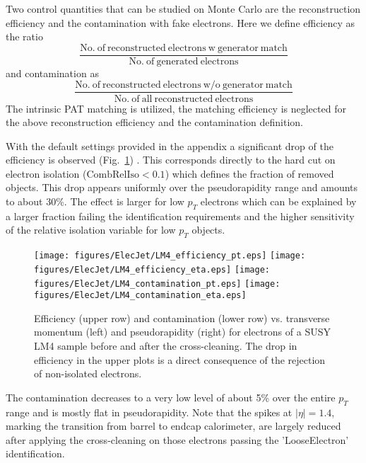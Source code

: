 \documentclass{cmspaper}
\begin{document}
Two control quantities that can be
studied on Monte Carlo are the reconstruction efficiency and the contamination
with fake electrons. Here we define efficiency as the ratio 
\[\frac{\mathrm{No.\ of\ reconstructed\ electrons\ w\ generator\ match}}{\mathrm{No.\ of\ generated\ electrons}}\]
and contamination as
\[\frac{\mathrm{No.\ of\ reconstructed\ electrons\ w/o\ generator\ match
}}{\mathrm{No.\ of\ all\ reconstructed\ electrons}}\]
The intrinsic PAT matching is utilized, the matching efficiency is neglected for
the above reconstruction efficiency and the contamination definition.

With the default settings provided in the appendix a significant drop of the
efficiency is observed (Fig.~\ref{fig:effCont_elec_ElecJet}) . This
corresponds directly to the hard cut on electron isolation
($\mathrm{CombRelIso}<0.1$) which defines the fraction of removed objects. This
drop appears uniformly over the pseudorapidity range and amounts to
about 30\%.  The effect is larger for low $p_T$ electrons which can be
explained by a larger fraction failing the identification requirements and the
higher sensitivity of the relative isolation variable for low $p_T$ objects.

\begin{figure}[hb]
\begin{center}
    \texttt{[image: figures/ElecJet/LM4\_efficiency\_pt.eps]}
    \texttt{[image: figures/ElecJet/LM4\_efficiency\_eta.eps]}
    \texttt{[image: figures/ElecJet/LM4\_contamination\_pt.eps]}
    \texttt{[image: figures/ElecJet/LM4\_contamination\_eta.eps]}
    \caption{Efficiency (upper row) and contamination (lower row) vs. transverse
    momentum (left) and pseudorapidity (right) for electrons of a SUSY LM4
    sample before and after
    the cross-cleaning. The drop in efficiency in the upper plots is a direct
    consequence of the rejection of non-isolated electrons.} \label{fig:effCont_elec_ElecJet}
\end{center}
\end{figure}

The contamination decreases to a very low level of about 5\% over the entire $p_T$
range and is mostly flat in pseudorapidity. Note that the spikes at
$|\eta|=1.4$, marking the transition from barrel to endcap calorimeter, are
largely reduced after applying the cross-cleaning on those electrons passing the
'LooseElectron' identification.
\end{document}
